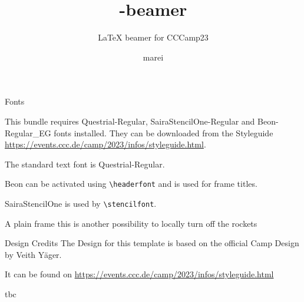 \documentclass[aspectratio=169,t]{beamer}
\title{\texorpdfstring{\raisebox{-.3\height}{\texttt{[image: sprayed-23]}}}{CCCamp23}-beamer}
\subtitle{\LaTeX{} beamer for CCCamp23}
\author{marei \email{chaos@texhackse.de}}
\begin{document}
\maketitle
	
\begin{frame}[fragile]{Fonts}

This bundle requires Questrial-Regular, SairaStencilOne-Regular and Beon-Regular\_EG fonts installed. They can be downloaded from the Styleguide \url{https://events.ccc.de/camp/2023/infos/styleguide.html}.
	
The standard text font is Questrial-Regular.

Beon can be activated using \verb+\headerfont+ and is used for frame titles.

SairaStencilOne is used by \verb+\stencilfont+. 

\end{frame}

\begin{frame}[plain]{A plain frame}
this is another possibility to locally turn off the rockets
\end{frame}

\begin{frame}{Design Credits}
The Design for this template is based on the official Camp Design by Veith Yäger.

It can be found on \url{https://events.ccc.de/camp/2023/infos/styleguide.html}
\end{frame}

\begin{frame}
	tbc
\end{frame}
\end{document}
